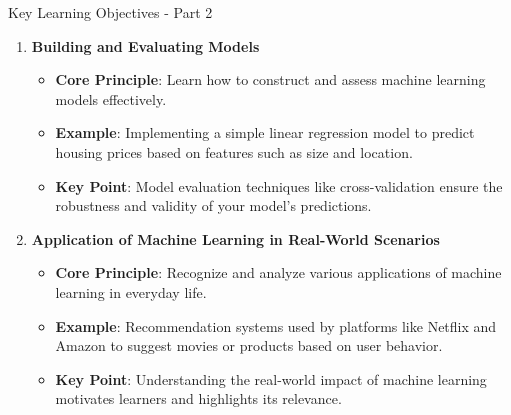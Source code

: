 \documentclass[aspectratio=169]{beamer}
\begin{document}
\begin{frame}[fragile]{Key Learning Objectives - Part 2}
    \begin{enumerate}[resume]
        \item \textbf{Building and Evaluating Models}
        \begin{itemize}
            \item \textbf{Core Principle}: Learn how to construct and assess machine learning models effectively.
            \item \textbf{Example}: Implementing a simple linear regression model to predict housing prices based on features such as size and location.
            \item \textbf{Key Point}: Model evaluation techniques like cross-validation ensure the robustness and validity of your model’s predictions.
        \end{itemize}
        
        \item \textbf{Application of Machine Learning in Real-World Scenarios}
        \begin{itemize}
            \item \textbf{Core Principle}: Recognize and analyze various applications of machine learning in everyday life.
            \item \textbf{Example}: Recommendation systems used by platforms like Netflix and Amazon to suggest movies or products based on user behavior.
            \item \textbf{Key Point}: Understanding the real-world impact of machine learning motivates learners and highlights its relevance.
        \end{itemize}
    \end{enumerate}
\end{frame}
\end{document}
